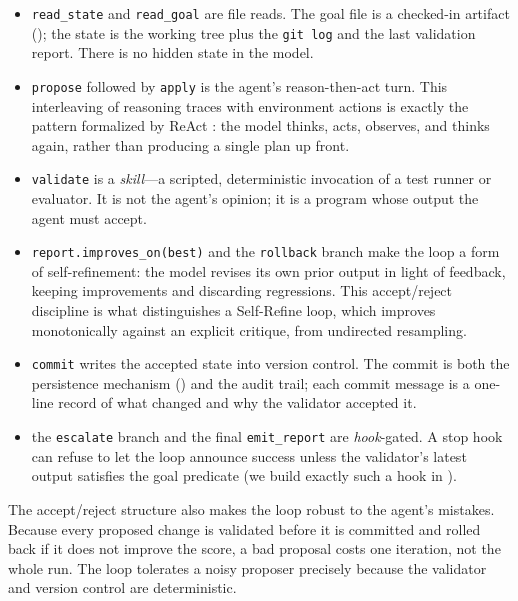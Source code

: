 \begin{itemize}
  \item \texttt{read\_state} and \texttt{read\_goal} are file reads. The goal
        file is a checked-in artifact (); the state is
        the working tree plus the \texttt{git log} and the last validation
        report. There is no hidden state in the model.
  \item \texttt{propose} followed by \texttt{apply} is the agent's
        reason-then-act turn. This interleaving of reasoning traces with
        environment actions is exactly the pattern formalized by ReAct
        \cite{yao2022react}: the model thinks, acts, observes, and thinks again,
        rather than producing a single plan up front.
  \item \texttt{validate} is a \emph{skill}---a scripted, deterministic
        invocation of a test runner or evaluator. It is not the agent's opinion;
        it is a program whose output the agent must accept.
  \item \texttt{report.improves\_on(best)} and the \texttt{rollback} branch make
        the loop a form of self-refinement: the model revises its own prior
        output in light of feedback, keeping improvements and discarding
        regressions. This accept/reject discipline is what distinguishes a Self-Refine
        \cite{madaan2023selfrefine} loop, which improves monotonically against an
        explicit critique, from undirected resampling.
  \item \texttt{commit} writes the accepted state into version control. The
        commit is both the persistence mechanism ()
        and the audit trail; each commit message is a one-line record of what
        changed and why the validator accepted it.
  \item the \texttt{escalate} branch and the final \texttt{emit\_report} are
        \emph{hook}-gated. A stop hook can refuse to let the loop announce
        success unless the validator's latest output satisfies the goal predicate
        (we build exactly such a hook in ).
\end{itemize}

The accept/reject structure also makes the loop robust to the agent's mistakes.
Because every proposed change is validated before it is committed and rolled back
if it does not improve the score, a bad proposal costs one iteration, not the
whole run. The loop tolerates a noisy proposer precisely because the validator
and version control are deterministic.

